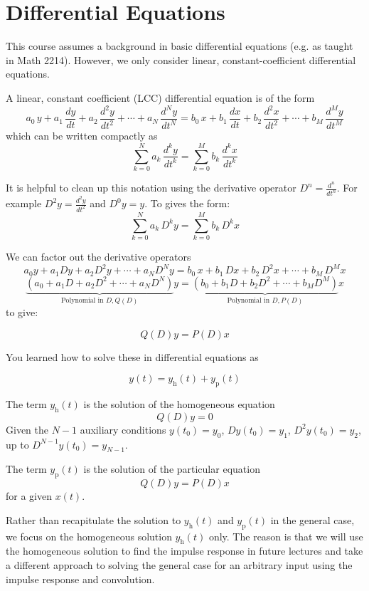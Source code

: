 \section{Differential Equations}

This course assumes a background in basic differential equations (e.g. as taught in Math 2214). However, we only consider linear, constant-coefficient differential equations.

A linear, constant coefficient (LCC) differential equation is of the form
\[
a_0\, y + a_1\, \frac{dy}{dt} + a_2\, \frac{d^2y}{dt^2} + \cdots + a_N\, \frac{d^Ny}{dt^N}  = b_0\, x + b_1\, \frac{dx}{dt} + b_2\, \frac{d^2x}{dt^2} + \cdots + b_M\, \frac{d^My}{dt^M}
\]
which can be written compactly as
\[
\sum\limits_{k = 0}^{N} a_k\, \frac{d^ky}{dt^k} = \sum\limits_{k = 0}^{M} b_k\, \frac{d^kx}{dt^k}
\]

It is helpful to clean up this notation using the derivative operator $D^n = \frac{d^n}{dt^n}$. For example
$D^2y = \frac{d^2y}{dt^2}$ and $D^0 y= y$. To gives the form:
\[
\sum\limits_{k = 0}^{N} a_k\, D^k y = \sum\limits_{k = 0}^{M} b_k\, D^k x
\]

We can factor out the derivative operators
\[
a_0y + a_1Dy + a_2D^2y + \cdots + a_ND^Ny  = b_0\, x + b_1\, Dx + b_2\, D^2x + \cdots + b_M\, D^M x
\]
\[
\underbrace{\left(a_0 + a_1D + a_2D^2 + \cdots + a_ND^N\right)}_{\text{Polynomial in } D, Q(D)} y = \underbrace{\left(b_0 + b_1 D + b_2 D^2 + \cdots + b_M D^M\right)}_{\text{Polynomial in } D, P(D)} x
\]
to give:
  
\[
Q(D)y = P(D)x
\]

You learned how to solve these in differential equations as

\[
y(t) = y_\text{h}(t) + y_\text{p}(t)
\]

The term $y_\text{h}(t)$ is the solution of the homogeneous equation
\[
Q(D)y = 0
\]
Given the $N-1$ auxiliary conditions $y(t_0) = y_0$, $Dy(t_0) = y_1$, $D^2y(t_0) = y_2$, up to $D^{N-1}y(t_0) = y_{N-1}$.

The term $y_\text{p}(t)$ is the solution of the particular equation
\[
Q(D)y = P(D)x
\]
for a given $x(t)$.

Rather than recapitulate the solution to $y_\text{h}(t)$ and $y_\text{p}(t)$ in the general case, we focus on the homogeneous solution $y_\text{h}(t)$ only. The reason is that we will use the homogeneous solution to find the impulse response in future lectures and take a different approach to solving the general case for an arbitrary input using the impulse response and convolution.


